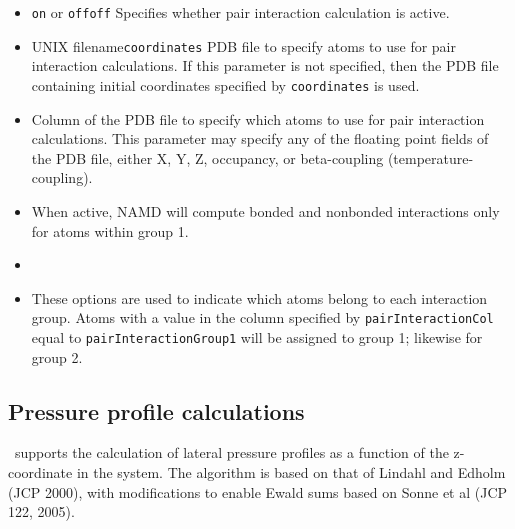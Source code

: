 \begin{itemize}

\item
{}
{{\tt on} or {\tt off}}{{\tt off}}
{Specifies whether pair interaction calculation is active.}

\item
{}
{UNIX filename}{{\tt coordinates}}
{PDB file to specify atoms to use for pair interaction calculations.  If 
this parameter is not specified, then the PDB file containing initial 
coordinates specified by {\tt coordinates} is used.}

\item
{}
{
Column of the PDB file to specify which atoms to use for pair interaction
calculations.  This parameter may specify any of the floating point
fields of the PDB file, either X, Y, Z, occupancy, or beta-coupling
(temperature-coupling).  
}

\item
{}
{
When active, NAMD will compute bonded and nonbonded interactions only for atoms 
within group 1.  
}
 
\item
{}

\item
{}
{
These options are used to indicate which atoms belong to each interaction 
group.  Atoms with a value in the column specified by {\tt pairInteractionCol} 
equal to {\tt pairInteractionGroup1} will be assigned to group 1; likewise
for group 2.
}
\end{itemize}

\subsection{Pressure profile calculations}
\NAMD\ supports the calculation of lateral pressure profiles as a function of
the z-coordinate in the system.  The algorithm is based on that of 
Lindahl and Edholm (JCP 2000), with modifications to enable Ewald sums based on
Sonne et al (JCP 122, 2005). 

